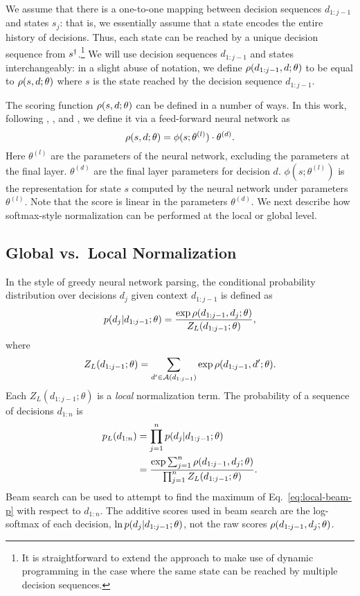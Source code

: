 We assume that there is a
one-to-one mapping between decision sequences $d_{1:j-1}$ and
states $s_j$: that is, we essentially assume that a state
encodes the entire history of decisions.
Thus, each state can be reached by a unique decision
sequence from $s^{\dagger}$.\footnote{It is straightforward to extend the
  approach to make use of dynamic programming in the case where the
  same state can be reached by multiple decision sequences.}
We will use decision sequences $d_{1:j-1}$ and states
interchangeably: in a slight abuse of notation, we define
$\rho(d_{1:j-1}, d; \theta)$ to be equal to $\rho(s, d; \theta)$ where $s$ is the
state reached by the decision sequence $d_{1:j-1}$.

The scoring function $\rho(s, d; \theta)$ can be defined in a number
of ways. 
In this work, following , ,
and ,
we define it via a feed-forward neural network as
\[
\rho(s, d; \theta) = \phi(s; \theta^{(l)}) \cdot \theta^{(d)} .
\]
Here $\theta^{(l)}$ are the parameters of the neural network,
excluding the parameters at the final layer. $\theta^{(d)}$ are the
final layer parameters for decision $d$.
$\phi(s; \theta^{(l)})$ is the
representation for state $s$ computed by the neural network under
parameters $\theta^{(l)}$. Note that the score is linear in the
parameters $\theta^{(d)}$. We next describe how
softmax-style normalization can be performed at the local or global level.

\subsection{Global vs.~Local Normalization}

In the  style of greedy neural
network parsing, the conditional probability distribution over
decisions $d_j$ given context $d_{1:j-1}$ is defined as
\begin{multline}
  \label{eq:local-p}
  p(d_j|d_{1:j-1} {; \theta}) = \frac{\exp \rho(d_{1:j-1},d_j {; \theta}) }{Z_L(d_{1:j-1} {; \theta})} ,
\end{multline}
where
$$
Z_L(d_{1:j-1} {; \theta}) = \sum_{d'\in {\cal A}(d_{1:j-1})} \exp \rho(d_{1:j-1},d' {; \theta})  .
$$
Each $Z_L(d_{1:j-1}; \theta)$ is a {\em local} normalization term.
The probability of a sequence of decisions $d_{1:n}$ is
\begin{align}
  \nonumber
  p_L(d_{1:n} {}) &= \prod_{j=1}^n p(d_j|d_{1:j-1} {; \theta}) \nonumber \\
  \label{eq:local-beam-p}
  &= \frac{\exp \sum_{j=1}^n \rho(d_{1:j-1},d_j {; \theta})}{
    \prod_{j=1}^n Z_L(d_{1:j-1} {; \theta})} .
\end{align}
Beam search can be used to attempt to find the maximum of
Eq.~\eqref{eq:local-beam-p} with respect to $d_{1:n}$. The additive scores
used in beam search are the log-softmax of each decision, $\ln
p(d_j|d_{1:j-1} {; \theta})$, not the raw scores $\rho(d_{1:j-1},d_j {; \theta})$.

